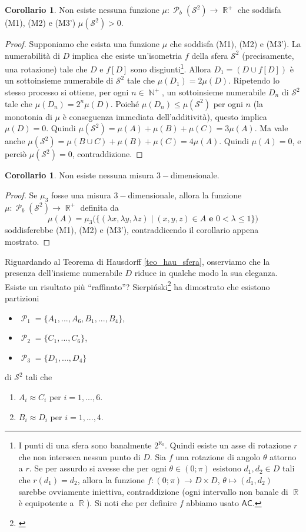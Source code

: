 \documentclass[12pt,a4paper]{report}
\theoremstyle{definition}
\newtheorem{corollario}[teo]{Corollario}  %
\theoremstyle{num.custom-title}
\DeclareMathOperator{\PP}{\mathcal{P}}
\DeclareMathOperator{\N}{\mathbb{N}}
\DeclareMathOperator{\R}{\mathbb{R}}
\newcommand{\AC}{\ensuremath{\mathsf{AC}}\xspace}
\renewcommand{\S}{\mathcal{S}}
\begin{document}
\begin{corollario}
Non esiste nessuna funzione $\mu: \PP_b(\S^2) \to \R^+$ che soddisfa (M1), (M2) e (M3') $\mu(\S^2)>0$.
\begin{proof}
Supponiamo che esista una funzione $\mu$ che soddisfa (M1), (M2) e (M3'). La numerabilità di $D$ implica che esiste un'isometria $f$ della sfera $\S^2$ (precisamente, una rotazione) tale che $D$ e $f[D]$ sono disgiunti\footnote{I punti di una sfera sono banalmente $2^{\aleph_0}$. Quindi esiste un asse di rotazione $r$ che non interseca nessun punto di $D$. Sia $f$ una rotazione di angolo $\theta$ attorno a $r$. Se per assurdo si avesse che per ogni $\theta \in (0;\pi)$ esistono $d_1, d_2 \in D$ tali che $r(d_1)=d_2$, allora la funzione $f : (0;\pi) \to D \times D$, $\theta \mapsto (d_1,d_2)$ sarebbe ovviamente iniettiva, contraddizione (ogni intervallo non banale di $\R$ è equipotente a $\R$). Si noti che per definire $f$ abbiamo usato \AC.}. Allora $D_1=(D \cup f[D])$ è un sottoinsieme numerabile di $\S^2$ tale che $\mu(D_1)= 2\mu(D)$. Ripetendo lo stesso processo si ottiene, per ogni $n \in \N^+$, un sottoinsieme numerabile $D_n$ di $\S^2$ tale che $\mu(D_n)=2^n \mu(D)$. Poiché $\mu(D_n) \leq \mu(\S^2)$ per ogni $n$ (la monotonia di $\mu$ è conseguenza immediata dell'additività), questo implica $\mu(D)=0$. Quindi $\mu(\S^2)=\mu(A)+\mu(B)+\mu(C)=3 \mu(A)$. Ma vale anche $\mu(\S^2)=\mu(B \cup C) + \mu(B) + \mu(C) = 4 \mu(A)$. Quindi $\mu(A)=0$, e perciò $\mu(\S^2)=0$, contraddizione.
\end{proof}
\end{corollario}

\begin{corollario}
Non esiste nessuna misura $3-$dimensionale.
\begin{proof}
Se $\mu_3$ fosse una misura $3-$dimensionale, allora la funzione $\mu: \PP_b(\S^2) \to \R^+$ definita da 
\[
\mu(A)=\mu_3 \big( \{(\lambda x, \lambda y, \lambda z) \mid (x,y,z) \in A \textbf{ e } 0<\lambda \leq 1\} \big)
\]
soddisferebbe (M1), (M2)	e (M3'), contraddicendo il corollario appena mostrato.
\end{proof}
\end{corollario}

Riguardando al Teorema di Hausdorff \ref{teo_hau_sfera}, osserviamo che la presenza dell'insieme numerabile $D$ riduce in qualche modo la sua eleganza. Esiste un risultato più ``raffinato''? Sierpiński\footnote{\cite{Sie48:Herrlich}} ha dimostrato che esistono partizioni
\begin{itemize}
\item[] $\PP_1=\{A_1,...,A_6,B_1,...,B_4\}$,
\item[] $\PP_2=\{C_1,...,C_6\}$,
\item[] $\PP_3=\{D_1,...,D_4\}$
\end{itemize}
di $\S^2$ tali che 
\begin{enumerate}
\item $A_i \approx C_i$ per $i=1,...,6$.
\item $B_i \approx D_i$ per $i=1,...,4$.
\end{enumerate}
\end{document}
